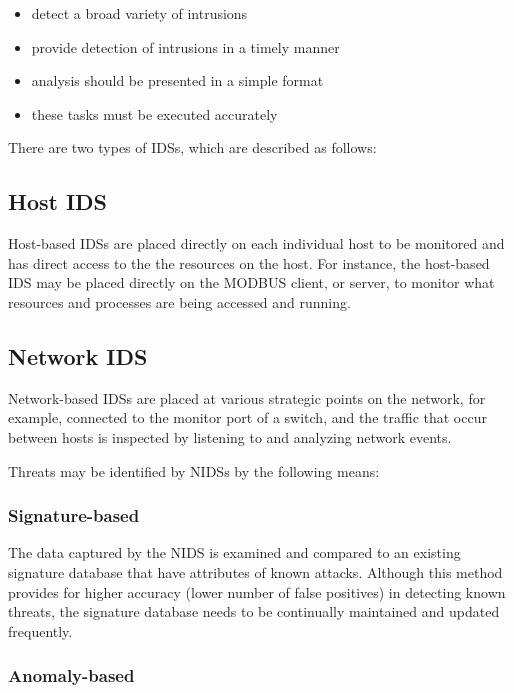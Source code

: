 \documentclass[11pt,a4paper]{article}
\begin{document}
\begin{itemize}
\itemsep1pt\parskip0pt
\item
  detect a broad variety of intrusions
\item
  provide detection of intrusions in a timely manner
\item
  analysis should be presented in a simple format
\item
  these tasks must be executed accurately
\end{itemize}

There are two types of IDSs, which are described as follows:

\subsection{Host IDS}\label{host-ids}

Host-based IDSs are placed directly on each individual host to be
monitored and has direct access to the the resources on the host. For
instance, the host-based IDS may be placed directly on the MODBUS
client, or server, to monitor what resources and processes are being
accessed and running.

\subsection{Network IDS}\label{network-ids}

Network-based IDSs are placed at various strategic points on the
network, for example, connected to the monitor port of a switch, and the
traffic that occur between hosts is inspected by listening to and
analyzing network events.

Threats may be identified by NIDSs by the following means:

\subsubsection{Signature-based}\label{signature-based}

The data captured by the NIDS is examined and compared to an existing
signature database that have attributes of known attacks. Although this
method provides for higher accuracy (lower number of false positives) in
detecting known threats, the signature database needs to be continually
maintained and updated frequently.

\subsubsection{Anomaly-based}\label{anomaly-based}
\end{document}
